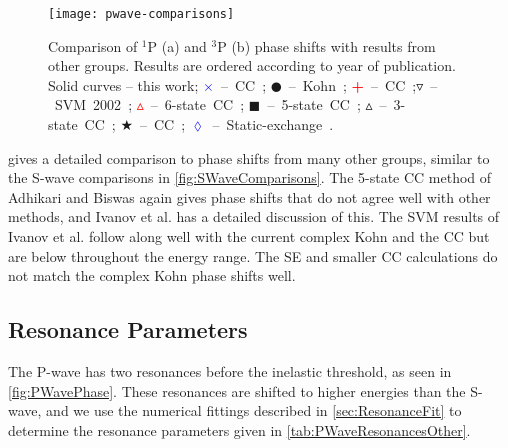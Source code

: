 \documentclass[Dissertation.tex]{subfiles}
\begin{document}
\begin{figure}
	\centering
	\texttt{[image: pwave-comparisons]}
	\caption[Comparison of P-wave phase shifts]{Comparison of $^1$P (a) and $^3$P (b) phase shifts with results from other groups. Results are ordered according to year of publication. Solid curves -- this work; \mbox{\textcolor{blue}{$\times$} -- CC \cite{Walters2004};} \mbox{$\CIRCLE$ -- Kohn \cite{VanReeth2003};} \mbox{\textcolor{red}{\textbf{+}} -- CC \cite{Blackwood2002};}\mbox{$\triangledown$ -- SVM 2002 \cite{Ivanov2002};} \mbox{\textcolor{red}{$\vartriangle$} -- 6-state CC \cite{Sinha2000};} \mbox{$\blacksquare$ -- 5-state CC \cite{Adhikari1999};} \mbox{$\vartriangle$ -- 3-state CC \cite{Sinha1997};} \mbox{\textcolor[RGB]{0,127,0}{$\bigstar$} -- CC \cite{Ray1997};} \mbox{\textcolor{blue}{$\lozenge$} -- Static-exchange \cite{Hara1975}.}}
	\label{fig:PWaveComparisons}
\end{figure}

 gives a detailed comparison to phase shifts from 
many other groups, similar to the S-wave comparisons in
\cref{fig:SWaveComparisons}. The 5-state CC method of Adhikari and Biswas
\cite{Adhikari1999} again gives phase shifts that do not agree well with other 
methods, and Ivanov et al. \cite{Ivanov2002} has a detailed discussion of 
this. The SVM results of Ivanov et al. \cite{Ivanov2002} follow along well 
with the current complex Kohn and the CC \cite{Blackwood2002,Walters2004} but 
are below throughout the energy range. The SE
\cite{Hara1975,Ray1997} and smaller CC calculations \cite{Sinha1997} do not
match the complex Kohn phase shifts well.


\subsection{Resonance Parameters}
\label{sec:PWaveResonances}

The P-wave has two 
resonances before the inelastic threshold, as seen in \cref{fig:PWavePhase}. 
These resonances are shifted to higher energies than the
S-wave, and we use the numerical fittings described in \cref{sec:ResonanceFit}
to determine the resonance parameters given in \cref{tab:PWaveResonancesOther}.
\end{document}
